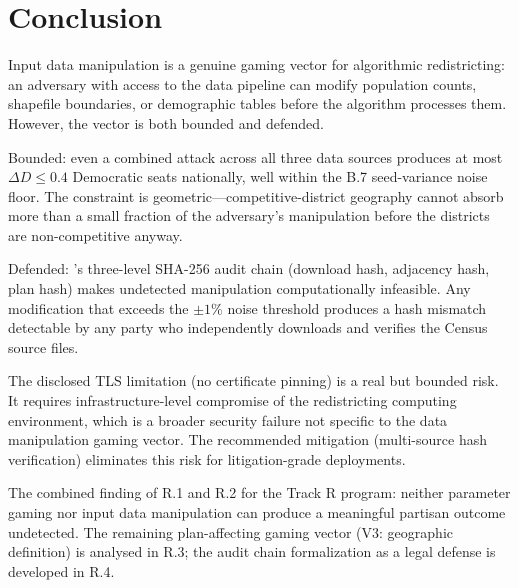 \section{Conclusion}
\label{sec:conclusion}

Input data manipulation is a genuine gaming vector for algorithmic
redistricting: an adversary with access to the data pipeline can modify
population counts, shapefile boundaries, or demographic tables before
the algorithm processes them.
However, the vector is both bounded and defended.

Bounded: even a combined attack across all three data sources produces
at most $\Delta D \leq 0.4$ Democratic seats nationally, well within
the B.7 seed-variance noise floor.
The constraint is geometric---competitive-district geography cannot
absorb more than a small fraction of the adversary's manipulation
before the districts are non-competitive anyway.

Defended: \bisect{}'s three-level SHA-256 audit chain (download hash,
adjacency hash, plan hash) makes undetected manipulation computationally
infeasible.
Any modification that exceeds the $\pm 1\%$ noise threshold produces
a hash mismatch detectable by any party who independently downloads
and verifies the Census source files.

The disclosed TLS limitation (no certificate pinning) is a real but
bounded risk.
It requires infrastructure-level compromise of the redistricting
computing environment, which is a broader security failure not specific
to the data manipulation gaming vector.
The recommended mitigation (multi-source hash verification) eliminates
this risk for litigation-grade deployments.

The combined finding of R.1 and R.2 for the Track R program: neither
parameter gaming nor input data manipulation can produce a meaningful
partisan outcome undetected.
The remaining plan-affecting gaming vector (V3: geographic definition)
is analysed in R.3; the audit chain formalization as a legal defense
is developed in R.4.
